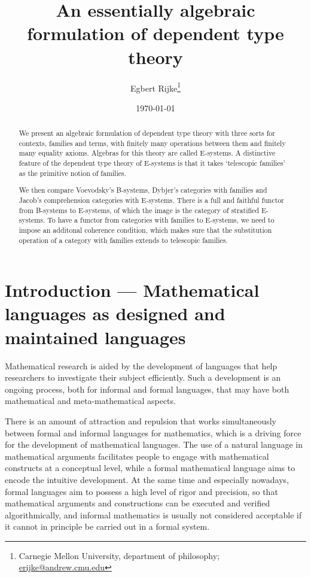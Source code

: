 \documentclass{article}
\title{An essentially algebraic formulation of dependent type theory}
\author{Egbert Rijke\footnote{{\sc Carnegie Mellon University}, department of
philosophy; \url{erijke@andrew.cmu.edu}}}
\date{\today}
\begin{document}
\maketitle

\begin{abstract}
We present an algebraic formulation of dependent type theory with
three sorts for contexts, families and terms, with finitely many operations
between them and finitely many equality axioms. Algebras for this theory are
called E-systems. A distinctive feature of the dependent type theory of
E-systems is that it takes `telescopic families' as the primitive notion of
families.

We then compare Voevodsky's B-systems, Dybjer's categories
with families and Jacob's comprehension categories with E-systems. There is
a full and faithful functor from B-systems to E-systems, of which the image is
the category of stratified E-systems. To have a functor from categories with
families to E-systems, we need to impose an additonal coherence condition, which
makes sure that the substitution operation of a category with families extends 
to telescopic families. 
\end{abstract}


\section{Introduction --- Mathematical languages as designed and maintained languages}
Mathematical research is aided by the development of languages that help 
researchers to investigate their subject efficiently. Such a development is an
ongoing process, both for informal and formal languages, that may have both
mathematical and meta-mathematical aspects. 

There is an amount of attraction and repulsion that works simultaneously
between formal and informal languages for mathematics, which is a driving force
for the development of mathematical languages. The use of
a natural language in mathematical arguments facilitates people to engage
with mathematical constructs at a conceptual level, while a formal mathematical
language aims to encode the intuitive development. At the same time and 
especially nowadays, formal languages aim to possess a high level of rigor and
precision, so that mathematical arguments and constructions can be executed and
verified algorithmically, and informal mathematics is usually not considered
acceptable if it cannot in principle be carried out in a formal system.
\end{document}
